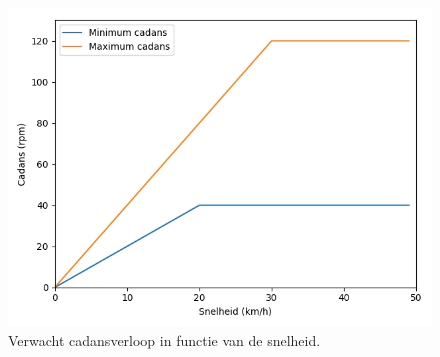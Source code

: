 \begin{figure}
  \includegraphics[width=\linewidth]{images/cadansverloop.png}
  \caption{Verwacht cadansverloop in functie van de snelheid.}
  \label{fig:cadansverloop}
\end{figure}
\newpage
